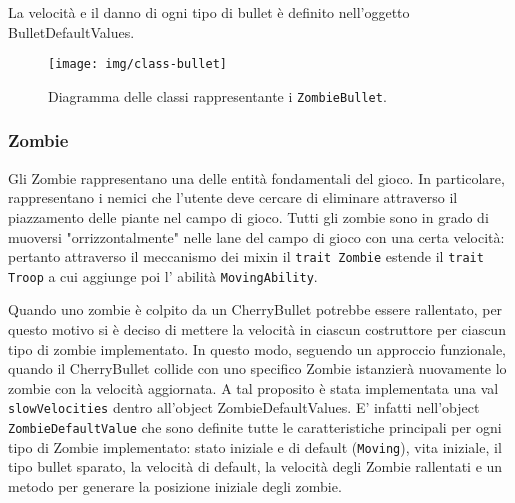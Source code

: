 La velocità e il danno di ogni tipo di bullet è definito nell'oggetto BulletDefaultValues.

\begin{figure}[H]
    \centering
    \texttt{[image: img/class-bullet]}
    \caption{Diagramma delle classi rappresentante i \texttt{ZombieBullet}.}
    \label{fig:class-bullet}
\end{figure}

\subsubsection{Zombie}
Gli Zombie rappresentano una delle entità fondamentali del gioco. In particolare, rappresentano i nemici che l'utente
deve cercare di eliminare attraverso il piazzamento delle piante nel campo di gioco.
Tutti gli zombie sono in grado di muoversi "orrizzontalmente" nelle lane del campo di gioco con una certa velocità: pertanto
attraverso il meccanismo dei mixin il \texttt{trait Zombie} estende il \texttt{trait Troop} a cui aggiunge poi l' abilità \texttt{MovingAbility}.

Quando uno zombie è colpito da un CherryBullet potrebbe essere rallentato, per questo motivo si è deciso di
mettere la velocità in ciascun costruttore per ciascun tipo di zombie implementato.
In questo modo, seguendo un approccio funzionale, quando il CherryBullet collide con uno specifico Zombie
istanzierà nuovamente lo zombie con la velocità aggiornata.
A tal proposito è stata implementata una val \texttt{slowVelocities} dentro all'object ZombieDefaultValues.
E' infatti nell'object \texttt{ZombieDefaultValue} che sono definite tutte le caratteristiche principali per ogni
tipo di Zombie implementato: stato iniziale e di default (\texttt{Moving}), vita iniziale,
il tipo bullet sparato, la velocità di default, la velocità degli Zombie rallentati e un metodo per generare
la posizione iniziale degli zombie.

